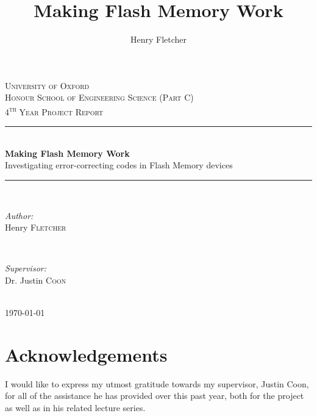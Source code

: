 \documentclass[11pt]{article}
\author{Henry Fletcher}
\title{Making Flash Memory Work}
\numberwithin{equation}{subsection}
\begin{document}
\begin{titlepage}

\newcommand{\HRule}{\rule{\linewidth}{0.5mm}}

\center
 
\textsc{\LARGE University of Oxford}\\[1.5cm] 
\textsc{\Large Honour School of Engineering Science (Part C)}\\[0.5cm]
\textsc{\large 4\textsuperscript{th} Year Project Report}\\[0.5cm]
\HRule \\[0.7cm]
{ \huge \bfseries Making Flash Memory Work}\\[0.2cm] %
{ \large Investigating error-correcting codes in Flash Memory devices}
\HRule \\[0.7cm]
\begin{minipage}{0.4\textwidth}
\begin{flushleft} \large
\emph{Author:}\\
Henry \textsc{Fletcher} %
\end{flushleft}
\end{minipage}
~
\begin{minipage}{0.4\textwidth}
\begin{flushright} \large
\emph{Supervisor:} \\
Dr. Justin \textsc{Coon} %
\end{flushright}
\end{minipage}\\[13cm]

{\large \today}\\[1cm]

\vfill 

\end{titlepage}


\section*{Acknowledgements}
I would like to express my utmost gratitude towards my supervisor, Justin Coon, for all of the assistance he has provided over this past year, both for the project as well as in his related lecture series.
\end{document}

